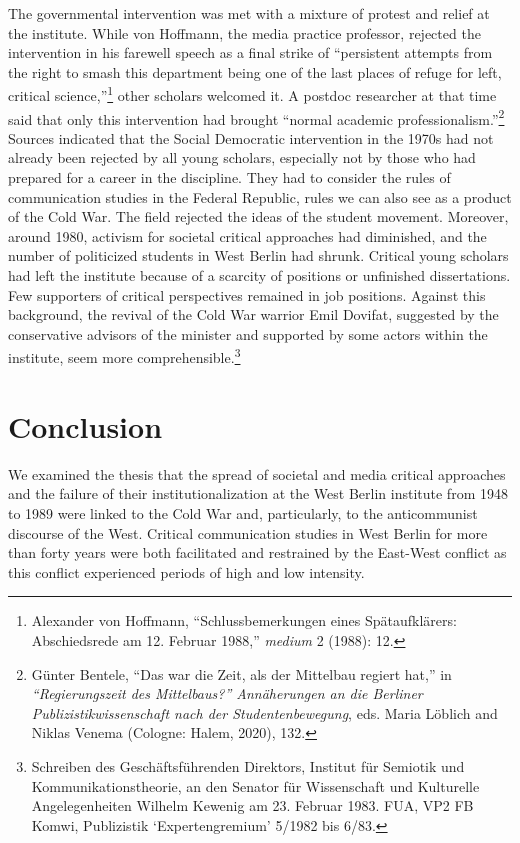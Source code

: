 \documentclass{tufte-handout}
\begin{document}
The governmental intervention was met with a mixture of protest and
relief at the institute. While von Hoffmann, the media practice
professor, rejected the intervention in his farewell speech as a final
strike of ``persistent attempts from the right to smash this department
being one of the last places of refuge for left, critical
science,''\footnote{Alexander von Hoffmann, ``Schlussbemerkungen eines
  Spätaufklärers: Abschiedsrede am 12. Februar 1988,'' \emph{medium} 2
  (1988): 12.} other scholars welcomed it. A postdoc researcher at that
time said that only this intervention had brought ``normal academic
professionalism.''\footnote{Günter Bentele, ``Das war die Zeit, als der
  Mittelbau regiert hat,'' in \emph{``Regierungszeit des Mittelbaus?''
  Annäherungen an die Berliner Publizistikwissenschaft nach der
  Studentenbewegung}, eds. Maria Löblich and Niklas Venema (Cologne:
  Halem, 2020), 132.} Sources indicated that the Social Democratic
intervention in the 1970s had not already been rejected by all young
scholars, especially not by those who had prepared for a career in the
discipline. They had to consider the rules of communication studies in
the Federal Republic, rules we can also see as a product of the Cold
War. The field rejected the ideas of the student movement. Moreover,
around 1980, activism for societal critical approaches had diminished,
and the number of politicized students in West Berlin had shrunk.
Critical young scholars had left the institute because of a scarcity of
positions or unfinished dissertations. Few supporters of critical
perspectives remained in job positions. Against this background, the
revival of the Cold War warrior Emil Dovifat, suggested by the
conservative advisors of the minister and supported by some actors
within the institute, seem more comprehensible.\footnote{Schreiben des
  Geschäftsführenden Direktors, Institut für Semiotik und
  Kommunikationstheorie, an den Senator für Wissenschaft und Kulturelle
  Angelegenheiten Wilhelm Kewenig am 23. Februar 1983. FUA, VP2 FB
  Komwi, Publizistik `Expertengremium' 5/1982 bis 6/83.}

\hypertarget{conclusion}{%
\section{Conclusion}\label{conclusion}}

We examined the thesis that the spread of societal and media critical
approaches and the failure of their institutionalization at the West
Berlin institute from 1948 to 1989 were linked to the Cold War and,
particularly, to the anticommunist discourse of the West. Critical
communication studies in West Berlin for more than forty years were both
facilitated and restrained by the East-West conflict as this conflict
experienced periods of high and low intensity.
\end{document}
